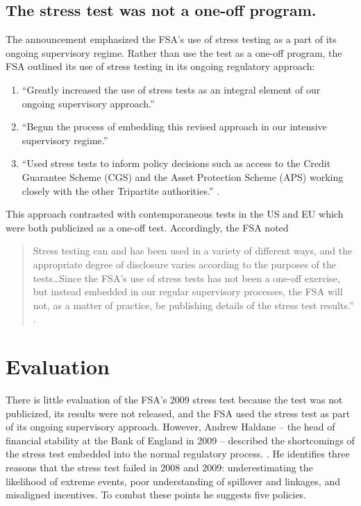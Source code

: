 \documentclass[12pt]{article}
\begin{document}
\subsection{The stress test was not a one-off program.}

The announcement emphasized the FSA's use of stress testing as a part of its ongoing supervisory regime. Rather than use the test as a one-off program, the FSA outlined its use of stress testing in its ongoing regulatory approach:

\begin{enumerate}
 \item ``Greatly increased the use of stress tests as an integral element of our ongoing supervisory approach.''
 \item ``Begun the process of embedding this revised approach in our intensive supervisory regime.''
 \item ``Used stress tests to inform policy decisions such as access to the Credit Guarantee Scheme (CGS) and the Asset Protection Scheme (APS) working closely with the other Tripartite authorities.'' \citep{Results}.
\end{enumerate}

This approach contrasted with contemporaneous tests in the US and EU which were both publicized as a one-off test. Accordingly, the FSA noted

\begin{quote}
  Stress testing can and has been used in a variety of different ways, and the appropriate degree of disclosure varies according to the purposes of the tests\dots Since the FSA’s use of stress tests has not been a one-off exercise, but instead embedded in our regular supervisory processes, the FSA will not, as a matter of practice, be publishing details of the stress test results.'' \citep{Results}.
\end{quote}

\section{Evaluation}

There is little evaluation of the FSA's 2009 stress test because the test was not publicized, its results were not released, and the FSA used the stress test as part of its ongoing supervisory approach. However, Andrew Haldane -- the head of financial stability at the Bank of England in 2009 -- described the shortcomings of the stress test embedded into the normal regulatory process. \citep{Haldane}. He identifies three reasons that the stress test failed in 2008 and 2009: underestimating the likelihood of extreme events, poor understanding of spillover and linkages, and misaligned incentives. To combat these points he suggests five policies.
\end{document}

